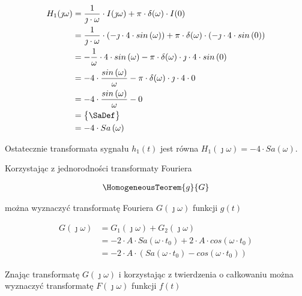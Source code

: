 \begin{task}
\begin{align*}
H_1(\jmath \omega) &= \frac{1}{\jmath \cdot \omega} \cdot I(\jmath \omega) + \pi \cdot \delta(\omega) \cdot I(0)\\
&=\frac{1}{\jmath \cdot \omega} \cdot \left(-\jmath \cdot 4 \cdot sin\left( \omega \right)\right) + \pi \cdot \delta(\omega) \cdot \left(-\jmath \cdot 4 \cdot sin\left( 0 \right)\right)\\
&=-\frac{1}{\omega} \cdot 4 \cdot sin\left( \omega\right) - \pi \cdot \delta(\omega) \cdot \jmath \cdot 4 \cdot sin\left( 0\right)\\
&=-4\cdot \frac{sin\left( \omega \right)}{\omega} - \pi \cdot \delta(\omega) \cdot \jmath \cdot 4 \cdot 0\\
&= -4 \cdot \frac{sin\left( \omega \right)}{\omega} - 0\\
&=\begin{Bmatrix}
\SaDef
\end{Bmatrix}\\
&=-4\cdot Sa\left( \omega\right)\\
\end{align*}

Ostatecznie transformata sygnału $h_1(t)$ jest równa $H_1(\jmath \omega)=- 4 \cdot Sa\left( \omega\right)$.












Korzystając z jednorodności transformaty Fouriera 

\begin{align*}
\HomogeneousTeorem{g}{G}
\end{align*}

można wyznaczyć transformatę Fouriera $G(\jmath \omega)$ funkcji $g(t)$

\begin{align*}
G(\jmath \omega) &= G_1(\jmath \omega)+G_2(\jmath \omega)\\
&= -2\cdot A \cdot Sa\left( \omega \cdot t_0\right) + 2 \cdot A \cdot cos\left( \omega \cdot t_0\right)\\
&= -2\cdot A \cdot \left( Sa\left( \omega \cdot t_0\right) - cos\left( \omega \cdot t_0\right) \right)
\end{align*}

Znając transformatę $G(\jmath \omega)$ i korzystając z twierdzenia o całkowaniu można wyznaczyć transformatę $F(\jmath \omega)$ funkcji $f(t)$


\end{task}
